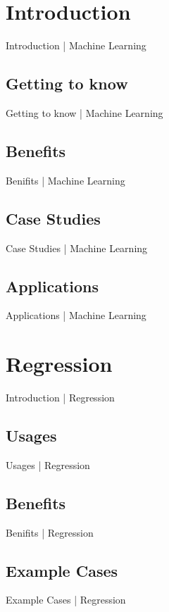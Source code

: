\documentclass[10pt]{beamer}
\begin{document}
\section{Introduction}
\begin{frame}{Introduction | Machine Learning}
\end{frame}
\subsection{Getting to know}
\begin{frame}{Getting to know | Machine Learning}
\end{frame}
\subsection{Benefits}
\begin{frame}{Benifits | Machine Learning}
\end{frame}
\subsection{Case Studies}
\begin{frame}{Case Studies | Machine Learning}
\end{frame}
\subsection{Applications}
\begin{frame}{Applications | Machine Learning}
\end{frame}

\section{Regression}
\begin{frame}{Introduction | Regression}
\end{frame}
\subsection{Usages}
\begin{frame}{Usages | Regression}
\end{frame}
\subsection{Benefits}
\begin{frame}{Benifits | Regression}
\end{frame}
\subsection{Example Cases}
\begin{frame}{Example Cases | Regression}
\end{frame}
\end{document}
